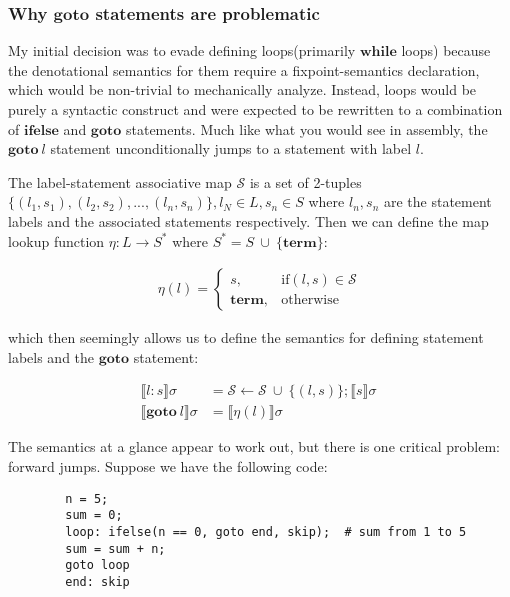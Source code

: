 \documentclass{article}
\begin{document}
	\subsubsection{Why $\mathbf{goto}$ statements are problematic}
	
	My initial decision was to evade defining loops(primarily $\mathbf{while}$ loops) because the denotational semantics for them require a fixpoint-semantics declaration, which would be non-trivial to mechanically analyze. Instead, loops would be purely a syntactic construct and were expected to be rewritten to a combination of $\mathbf{ifelse}$ and $\mathbf{goto}$ statements. Much like what you would see in assembly, the $\mathbf{goto} \ l$ statement unconditionally jumps to a statement with label $l$.
	
	The label-statement associative map $\mathcal{S}$ is a set of 2-tuples $\{ (l_1, s_1), (l_2, s_2), ..., (l_n, s_n) \}, l_N \in L, s_n \in S$ where $l_n, s_n$ are the statement labels and the associated statements respectively. Then we can define the map lookup function $\eta: L \to S^{*}$ where $S^{*} = S \ \cup \ \{ \mathbf{term} \}$:
	
	
	\begin{align*}
		\eta(l) = 
		\begin{cases}
			s, & \text{if} (l, s) \in \mathcal{S} \\
			\mathbf{term}, & \text{otherwise}
		\end{cases}
	\end{align*}
	
	which then seemingly allows us to define the semantics for defining statement labels and the $\mathbf{goto}$ statement:
	
	\begin{align*}
		\llbracket l: s \rrbracket \sigma &= \mathcal{S} \leftarrow \mathcal{S} \ \cup \ \{ (l, s) \}; \llbracket s \rrbracket \sigma\ \\
		\llbracket \mathbf{goto} \ l \rrbracket \sigma &= \llbracket \eta(l) \rrbracket \sigma
	\end{align*}
	
	The semantics at a glance appear to work out, but there is one critical problem: forward jumps. Suppose we have the following code:
	
	\begin{verbatim}
		n = 5;
		sum = 0;
		loop: ifelse(n == 0, goto end, skip);  # sum from 1 to 5
		sum = sum + n;
		goto loop
		end: skip
	\end{verbatim}
	
\end{document}
